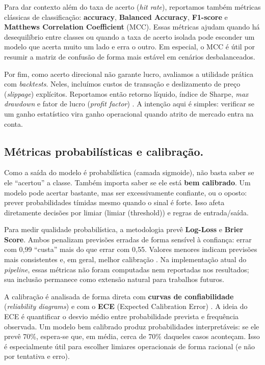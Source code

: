 Para dar contexto além do taxa de acerto (\textit{hit rate}), reportamos também métricas clássicas de classificação:
\textbf{accuracy}, \textbf{Balanced Accuracy}, \textbf{F1-score} e \textbf{Matthews Correlation Coefficient}
(MCC).
Essas métricas ajudam quando há desequilíbrio entre classes ou quando a taxa de acerto isolada
pode esconder um modelo que acerta muito um lado e erra o outro.
Em especial, o MCC é útil por resumir a matriz de confusão de forma mais estável
em cenários desbalanceados.

Por fim, como acerto direcional não garante lucro, avaliamos a utilidade prática com \textit{backtests}.
Neles, incluímos custos de transação e deslizamento de preço (\textit{slippage}) explícitos.
Reportamos então retorno líquido, índice de Sharpe, \textit{max drawdown} e fator de lucro (\textit{profit factor})
\cite{sharpe1994}.
A intenção aqui é simples: verificar se um ganho estatístico vira ganho operacional
quando atrito de mercado entra na conta.

\subsection{Métricas probabilísticas e calibração.}
Como a saída do modelo é probabilística (camada sigmoide),
não basta saber se ele “acertou” a classe.
Também importa saber se ele está \textbf{bem calibrado}.
Um modelo pode acertar bastante, mas ser excessivamente confiante,
ou o oposto: prever probabilidades tímidas mesmo quando o sinal é forte.
Isso afeta diretamente decisões por limiar (limiar (threshold))
e regras de entrada/saída.

Para medir qualidade probabilística, a metodologia prevê \textbf{Log-Loss} e \textbf{Brier Score}.
Ambos penalizam previsões erradas de forma sensível à confiança:
errar com 0,99 “custa” mais do que errar com 0,55.
Valores menores indicam previsões mais consistentes e, em geral, melhor calibração
\cite{brier1950}.
Na implementação atual do \textit{pipeline}, essas métricas não foram computadas nem reportadas nos resultados;
sua inclusão permanece como extensão natural para trabalhos futuros.

A calibração é analisada de forma direta com \textbf{curvas de confiabilidade} (\emph{reliability diagrams}) e com o \textbf{ECE} (Expected Calibration Error) \cite{guo2017}.
A ideia do ECE é quantificar o desvio médio entre probabilidade prevista e frequência observada.
Um modelo bem calibrado produz probabilidades interpretáveis:
se ele prevê 70\%, espera-se que, em média, cerca de 70\% daqueles casos aconteçam.
Isso é especialmente útil para escolher limiares operacionais de forma racional
(e não por tentativa e erro).

